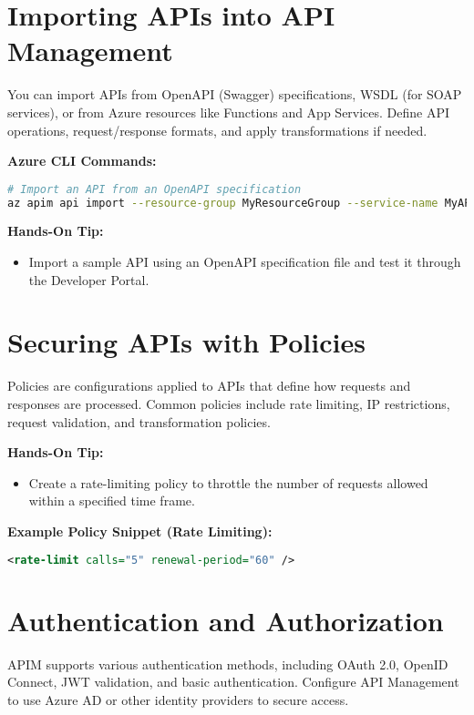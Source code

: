 \documentclass{article}
\begin{document}
\section{Importing APIs into API Management}
You can import APIs from OpenAPI (Swagger) specifications, WSDL (for SOAP services), or from Azure resources like Functions and App Services. Define API operations, request/response formats, and apply transformations if needed.

\textbf{Azure CLI Commands:}
\begin{lstlisting}[language=bash]
# Import an API from an OpenAPI specification
az apim api import --resource-group MyResourceGroup --service-name MyAPIMService --path myapi --specification-format OpenApi --specification-path https://myapi.example.com/swagger.json
\end{lstlisting}

\textbf{Hands-On Tip:}
\begin{itemize}
    \item Import a sample API using an OpenAPI specification file and test it through the Developer Portal.
\end{itemize}

\section{Securing APIs with Policies}
Policies are configurations applied to APIs that define how requests and responses are processed. Common policies include rate limiting, IP restrictions, request validation, and transformation policies.

\textbf{Hands-On Tip:}
\begin{itemize}
    \item Create a rate-limiting policy to throttle the number of requests allowed within a specified time frame.
\end{itemize}

\textbf{Example Policy Snippet (Rate Limiting):}
\begin{lstlisting}[language=xml]
<rate-limit calls="5" renewal-period="60" />
\end{lstlisting}

\section{Authentication and Authorization}
APIM supports various authentication methods, including OAuth 2.0, OpenID Connect, JWT validation, and basic authentication. Configure API Management to use Azure AD or other identity providers to secure access.
\end{document}
